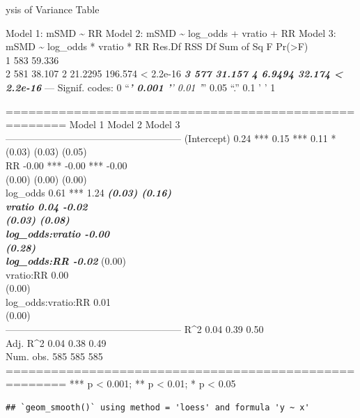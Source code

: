 \documentclass[
  english,
  man,floatsintext]{apa6}
\begin{document}
ysis of Variance Table

Model 1: mSMD \textasciitilde{} RR
Model 2: mSMD \textasciitilde{} log\_odds + vratio + RR
Model 3: mSMD \textasciitilde{} log\_odds * vratio * RR
Res.Df RSS Df Sum of Sq F Pr(\textgreater F)\\
1 583 59.336\\
2 581 38.107 2 21.2295 196.574 \textless{} 2.2e-16 \textbf{\emph{
3 577 31.157 4 6.9494 32.174 \textless{} 2.2e-16 }}
---
Signif. codes: 0 \enquote{\emph{\textbf{' 0.001 '}' 0.01 '}} 0.05 \enquote{.} 0.1 ' ' 1

======================================================
Model 1 Model 2 Model 3\\
------------------------------------------------------
(Intercept) 0.24 *** 0.15 *** 0.11 *\\
(0.03) (0.03) (0.05)\\
RR -0.00 *** -0.00 *** -0.00\\
(0.00) (0.00) (0.00)\\
log\_odds 0.61 *** 1.24 \textbf{\emph{
(0.03) (0.16)\\
vratio 0.04 -0.02\\
(0.03) (0.08)\\
log\_odds:vratio -0.00\\
(0.28)\\
log\_odds:RR -0.02 }}
(0.00)\\
vratio:RR 0.00\\
(0.00)\\
log\_odds:vratio:RR 0.01\\
(0.00)\\
------------------------------------------------------
R\^{}2 0.04 0.39 0.50\\
Adj. R\^{}2 0.04 0.38 0.49\\
Num. obs. 585 585 585\\
======================================================
*** p \textless{} 0.001; ** p \textless{} 0.01; * p \textless{} 0.05

\begin{verbatim}
## `geom_smooth()` using method = 'loess' and formula 'y ~ x'
\end{verbatim}
\end{document}
